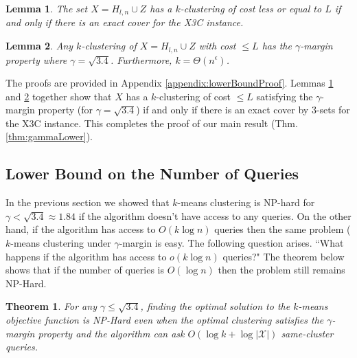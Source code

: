 \documentclass[letterpaper,12pt,titlepage,oneside,final]{book}
\newtheorem{lemma}{Lemma}
\newtheorem{theorem}{Theorem}
\newcommand{\mc}{\mathcal}
\begin{document}
\begin{lemma}
\label{lemma:kmeansEquivalenceX3C}
The set $X = H_{l,n} \cup Z$ has a $k$-clustering of cost less or equal to $L$ if and only if there is an exact cover for the X3C instance.
\end{lemma}

\begin{lemma}
\label{lemma:gammaLower}
Any $k$-clustering of $X = H_{l,n} \cup Z$ with cost $\le L$ has the $\gamma$-margin property where $\gamma = \sqrt{3.4}$. Furthermore, $k = \Theta(n^{\epsilon})$.
\end{lemma}

The proofs are provided in Appendix \ref{appendix:lowerBoundProof}. Lemmas \ref{lemma:kmeansEquivalenceX3C} and \ref{lemma:gammaLower} together show that $X$ has a $k$-clustering of cost $\le L$ satisfying the $\gamma$-margin property (for $\gamma = \sqrt{3.4}$) if and only if there is an exact cover by $3$-sets for the X3C instance. This completes the proof of our main result (Thm. \ref{thm:gammaLower}). 

\subsection{Lower Bound on the Number of Queries}
In the previous section we showed that $k$-means clustering is NP-hard for $\gamma < \sqrt{3.4} \approx 1.84$ if the algorithm doesn't have access to any queries. On the other hand, if the algorithm has access to $O(k\log n)$ queries then the same problem ($k$-means clustering under $\gamma$-margin is easy. The following question arises. ``What happens if the algorithm has access to $o(k\log n)$ queries?" The theorem below shows that if the number of queries is $O(\log n)$ then the problem still remains NP-Hard.

\begin{theorem}
\label{thm:queryLower}
For any $\gamma \le \sqrt{3.4}$, finding the optimal solution to the $k$-means objective function is NP-Hard even when the optimal clustering satisfies the $\gamma$-margin property and the algorithm can ask $O(\log k + \log |\mc X|)$ same-cluster queries.
\end{theorem}
\end{document}
